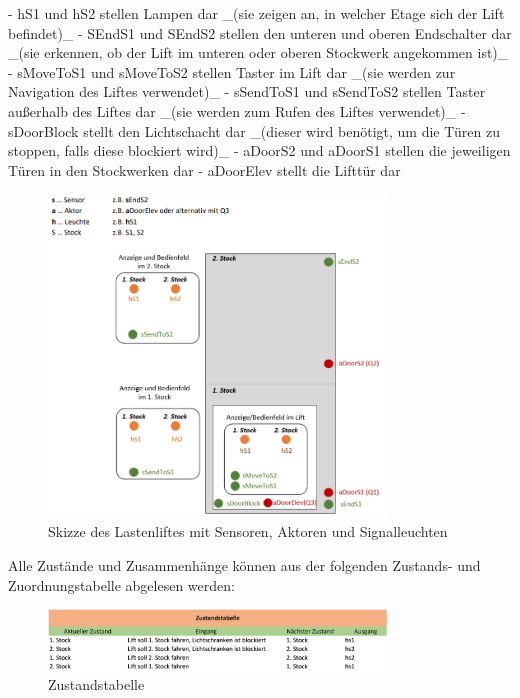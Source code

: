 \begin{markdown}
- hS1 und hS2 stellen Lampen dar _(sie zeigen an, in welcher Etage sich der Lift befindet)_
- SEndS1 und SEndS2 stellen den unteren und oberen Endschalter dar _(sie erkennen, ob der Lift im unteren oder oberen Stockwerk angekommen ist)_
- sMoveToS1 und sMoveToS2 stellen Taster im Lift dar _(sie werden zur Navigation des Liftes verwendet)_
- sSendToS1 und sSendToS2 stellen Taster außerhalb des Liftes dar _(sie werden zum Rufen des Liftes verwendet)_
- sDoorBlock stellt den Lichtschacht dar _(dieser wird benötigt, um die Türen zu stoppen, falls diese blockiert wird)_ 
- aDoorS2 und aDoorS1 stellen die jeweiligen Türen in den Stockwerken dar
- aDoorElev stellt die Lifttür dar

\begin{figure}[H]
    \centering
    \includegraphics[width=0.8\textwidth]{./images/Skizze.png}
    \caption[Skizze des Lastenliftes]{Skizze des Lastenliftes mit Sensoren, Aktoren und Signalleuchten}
\end{figure}

Alle Zustände und Zusammenhänge können aus der folgenden Zustands- und Zuordnungstabelle abgelesen werden:

\begin{figure}[H]
    \centering
    \includegraphics[width=0.8\textwidth]{./images/Zustandstabelle.png}
    \caption[Zustandstabelle]{Zustandstabelle}
\end{figure}


\end{markdown}
